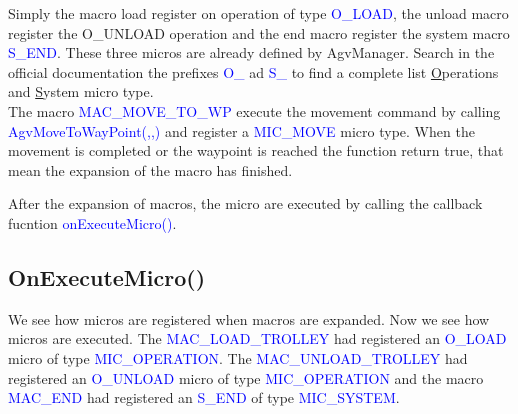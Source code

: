 Simply the macro load register on operation of type \textcolor{blue}{O\_LOAD}, the unload macro register the {O\_UNLOAD} operation and the end macro register the system macro \textcolor{blue}{S\_END}. These three micros are already defined by AgvManager.
Search in the official documentation the prefixes \textcolor{blue}{O\_} ad \textcolor{blue}{S\_} to find a complete list \underline{O}perations  and \underline{S}ystem micro type.\\

The macro \textcolor{blue}{MAC\_MOVE\_TO\_WP} execute the movement command by calling \textcolor{blue}{AgvMoveToWayPoint(,,)} and register a \textcolor{blue}{MIC\_MOVE} micro type. When the movement is completed or the waypoint is reached the function return true, that mean the expansion of the macro has finished.

After the expansion of macros, the micro are executed by calling the callback fucntion \textcolor{blue}{onExecuteMicro()}.

%
\subsection*{OnExecuteMicro()}
We see how micros are registered when macros are expanded. Now we see how micros are executed.
The \textcolor{blue}{MAC\_LOAD\_TROLLEY} had registered an \textcolor{blue}{O\_LOAD} micro of type \textcolor{blue}{MIC\_OPERATION}.
The \textcolor{blue}{MAC\_UNLOAD\_TROLLEY} had registered an \textcolor{blue}{O\_UNLOAD} micro of type \textcolor{blue}{MIC\_OPERATION} and the macro \textcolor{blue}{MAC\_END} had registered an \textcolor{blue}{S\_END} of type \textcolor{blue}{MIC\_SYSTEM}.

